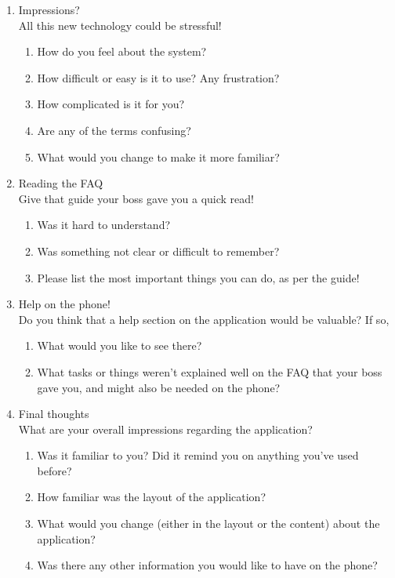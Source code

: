 \documentclass[12pt]{article}
\begin{document}
\begin{enumerate}
\item Impressions?\\
All this new technology could be stressful!
\begin{enumerate}
\item How do you feel about the system?
\item How difficult or easy is it to use? Any frustration?
\item How complicated is it for you?
\item Are any of the terms confusing?
\item What would you change to make it more familiar?
\end{enumerate}

\item Reading the FAQ\\
Give that guide your boss gave you a quick read!
\begin{enumerate}
\item Was it hard to understand?
\item Was something not clear or difficult to remember?
\item Please list the most important things you can do, as per the guide!
\end{enumerate}

\item Help on the phone!\\
Do you think that a help section on the application would be valuable? If so,
\begin{enumerate}
\item What would you like to see there?
\item What tasks or things weren't explained well on the FAQ that your boss gave you, and might also be needed on the phone?
\end{enumerate}

\item Final thoughts\\
What are your overall impressions regarding the application?
\begin{enumerate}
\item Was it familiar to you? Did it remind you on anything you've used before?
\item How familiar was the layout of the application?
\item What would you change (either in the layout or the content) about the application?
\item Was there any other information you would like to have on the phone?
\end{enumerate}

\end{enumerate}
\end{document}
